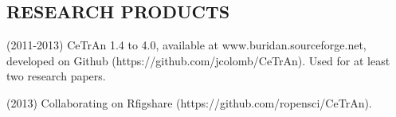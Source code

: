 %

\newpage

%
\subsection*{RESEARCH PRODUCTS}



\begin{itemize}
\begin{sloppypar}
%
\item(2011-2013) CeTrAn 1.4 to 4.0, available at www.buridan.sourceforge.net,
developed on Github (https://github.com/jcolomb/CeTrAn).
Used for at least two research papers.

\item(2013) Collaborating on Rfigshare (https://github.com/ropensci/CeTrAn).

%
%
\end{sloppypar}
\end{itemize}



